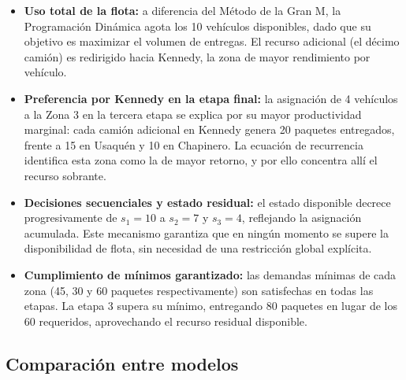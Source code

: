 \documentclass[12pt]{article}
\begin{document}
\begin{itemize}
	\item \textbf{Uso total de la flota:} a diferencia del Método de la Gran M, la Programación Dinámica agota los 10 vehículos disponibles, dado que su objetivo es maximizar el volumen de entregas. El recurso adicional (el décimo camión) es redirigido hacia Kennedy, la zona de mayor rendimiento por vehículo.
	
	\item \textbf{Preferencia por Kennedy en la etapa final:} la asignación de 4 vehículos a la Zona 3 en la tercera etapa se explica por su mayor productividad marginal: cada camión adicional en Kennedy genera 20 paquetes entregados, frente a 15 en Usaquén y 10 en Chapinero. La ecuación de recurrencia identifica esta zona como la de mayor retorno, y por ello concentra allí el recurso sobrante.
	
	\item \textbf{Decisiones secuenciales y estado residual:} el estado disponible decrece progresivamente de $s_1 = 10$ a $s_2 = 7$ y $s_3 = 4$, reflejando la asignación acumulada. Este mecanismo garantiza que en ningún momento se supere la disponibilidad de flota, sin necesidad de una restricción global explícita.
	
	\item \textbf{Cumplimiento de mínimos garantizado:} las demandas mínimas de cada zona (45, 30 y 60 paquetes respectivamente) son satisfechas en todas las etapas. La etapa 3 supera su mínimo, entregando 80 paquetes en lugar de los 60 requeridos, aprovechando el recurso residual disponible.
\end{itemize}

\subsection{Comparación entre modelos}
\end{document}
